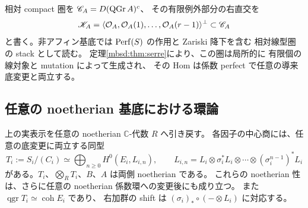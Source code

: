 相対 compact 圏を $\mathscr C_A=D(\operatorname{QGr} A)^c$、
その有限例外部分の右直交を
\[
 \mathscr K_A=
 \langle\mathcal O_A,\mathcal O_A(1),\ldots,\mathcal O_A(r-1)\rangle^\perp
       \subset\mathscr C_A
\]
と書く。非アフィン基底では $\operatorname{Perf}(S)$ の作用と Zariski 降下を含む
相対線型圏の stack として読む。
定理\ref{mbsd:thm:serre}により、この圏は局所的に
有限個の線対象と mutation によって生成され、
その Hom は係数 perfect で任意の導来底変更と両立する。

\subsection{任意の noetherian 基底における環論}

\begin{lemma}
\label{mbrn:lem:noetherian}
上の実表示を任意の noetherian $\mathbb C$-代数 $R$ へ引き戻す。
各因子の中心商には、任意の底変更に両立する同型
\begin{equation}\label{mbrn:eq:relative-thcr}
 T_i:=S_i/(C_i)\simeq
  \bigoplus_{n\geq0}H^0(E_i,L_{i,n}),\qquad
 L_{i,n}=L_i\otimes\sigma_i^*L_i\otimes\cdots
                        \otimes(\sigma_i^{n-1})^*L_i
\end{equation}
がある。$T_i$、$\bigotimes_RT_i$、$B$、$A$ は両側 noetherian である。
これらの noetherian 性は、さらに任意の noetherian 係数環への変更後にも成り立つ。
また $\operatorname{qgr}T_i\simeq\operatorname{coh}E_i$ であり、
右加群の shift は $(\sigma_i)_*\circ(-\otimes L_i)$ に対応する。
\end{lemma}
